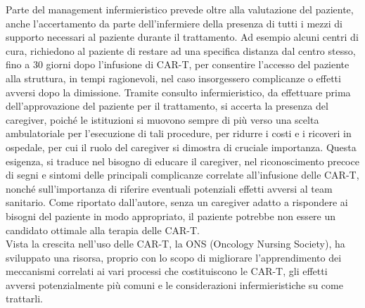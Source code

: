 Parte del management infermieristico prevede oltre alla valutazione del paziente, anche l’accertamento da parte 
dell’infermiere della presenza di tutti i mezzi di supporto necessari al paziente durante il trattamento. 
Ad esempio alcuni centri di cura, richiedono al paziente di restare ad una specifica distanza dal centro stesso, 
fino a 30 giorni dopo l’infusione di CAR-T, per consentire l’accesso del paziente alla struttura, in tempi ragionevoli, 
nel caso insorgessero complicanze o effetti avversi dopo la dimissione. Tramite consulto infermieristico, da effettuare 
prima dell’approvazione del paziente per il trattamento, si accerta la presenza del caregiver, 
poiché le istituzioni si muovono sempre di più verso una scelta ambulatoriale per l’esecuzione di tali procedure, 
per ridurre i costi e i ricoveri in ospedale, per cui il ruolo del caregiver si dimostra di cruciale importanza\cite{article2}. 
Questa esigenza, si traduce nel bisogno di educare il caregiver, nel riconoscimento precoce di segni e sintomi delle 
principali complicanze correlate all’infusione delle CAR-T, nonché sull’importanza di riferire eventuali potenziali 
effetti avversi al team sanitario. Come riportato dall’autore, senza un caregiver adatto a rispondere ai 
bisogni del paziente in modo appropriato, il paziente potrebbe non essere un candidato ottimale 
alla terapia delle CAR-T\cite{article2}.\\

Vista la crescita nell’uso delle CAR-T, la ONS (Oncology Nursing Society), ha sviluppato una risorsa, 
proprio con lo scopo di migliorare l’apprendimento dei meccanismi correlati ai vari processi che costituiscono 
le CAR-T, gli effetti avversi potenzialmente più comuni e le considerazioni infermieristiche su come trattarli\cite{ONSCART}.

